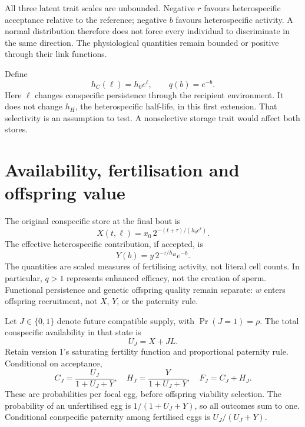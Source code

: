 \documentclass[11pt,a4paper]{article}
\begin{document}
All three latent trait scales are unbounded. Negative $r$ favours heterospecific acceptance relative to the reference; negative $b$ favours heterospecific activity. A normal distribution therefore does not force every individual to discriminate in the same direction. The physiological quantities remain bounded or positive through their link functions.

Define
\begin{equation}
h_C(\ell)=h_0e^\ell,\qquad q(b)=e^{-b}.
\end{equation}
Here $\ell$ changes conspecific persistence through the recipient environment. It does not change $h_H$, the heterospecific half-life, in this first extension. That selectivity is an assumption to test. A nonselective storage trait would affect both stores.

\section{Availability, fertilisation and offspring value}
The original conspecific store at the final bout is
\begin{equation}
X(t,\ell)=x_0\,2^{-(t+\tau)/(h_0e^\ell)}.
\label{eq:X}
\end{equation}
The effective heterospecific contribution, if accepted, is
\begin{equation}
Y(b)=y\,2^{-\tau/h_H}e^{-b}.
\label{eq:Y}
\end{equation}
The quantities are scaled measures of fertilising activity, not literal cell counts. In particular, $q>1$ represents enhanced efficacy, not the creation of sperm. Functional persistence and genetic offspring quality remain separate: $w$ enters offspring recruitment, not $X$, $Y$, or the paternity rule.

Let $J\in\{0,1\}$ denote future compatible supply, with $\Pr(J=1)=\rho$. The total conspecific availability in that state is
\begin{equation}
U_J=X+JL.
\end{equation}
Retain version 1's saturating fertility function and proportional paternity rule. Conditional on acceptance,
\begin{equation}
C_J=\frac{U_J}{1+U_J+Y},\quad
H_J=\frac{Y}{1+U_J+Y},\quad
F_J=C_J+H_J.
\label{eq:outcomes}
\end{equation}
These are probabilities per focal egg, before offspring viability selection. The probability of an unfertilised egg is $1/(1+U_J+Y)$, so all outcomes sum to one. Conditional conspecific paternity among fertilised eggs is $U_J/(U_J+Y)$.
\end{document}
